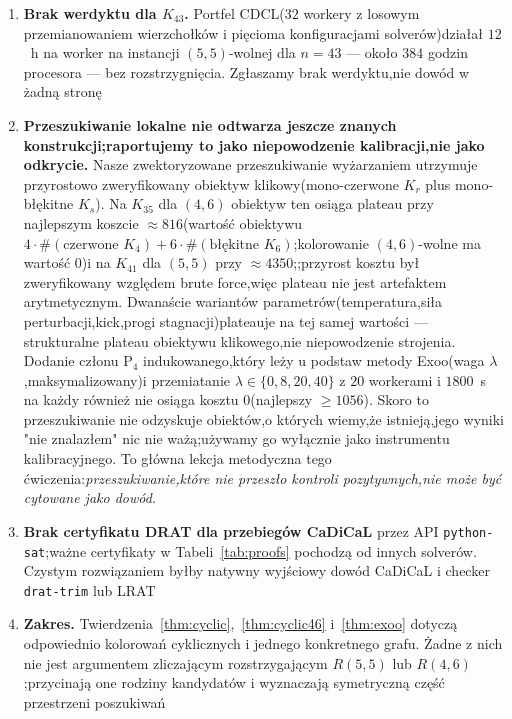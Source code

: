 \documentclass[11pt]{article}
\theoremstyle{definition}
\theoremstyle{plain}
\newcommand{\K}{\ensuremath{K}}
\newcommand{\R}[2]{\ensuremath{R(#1,#2)}}
\begin{document}
\begin{enumerate}
\item \textbf{Brak werdyktu dla $\K_{43}$.} Portfel CDCL($32$ workery z losowym przemianowaniem wierzchołków i pięcioma konfiguracjami solverów)działał $12$~h na worker na instancji $(5,5)$-wolnej dla $n = 43$ --- około $384$ godzin procesora --- bez rozstrzygnięcia. Zgłaszamy brak werdyktu,nie dowód w żadną stronę

\item \textbf{Przeszukiwanie lokalne nie odtwarza jeszcze znanych konstrukcji;raportujemy to jako niepowodzenie kalibracji,nie jako odkrycie.} Nasze zwektoryzowane przeszukiwanie wyżarzaniem utrzymuje przyrostowo zweryfikowany obiektyw klikowy(mono-czerwone $\K_r$ plus mono-błękitne $\K_s$). Na $K_{35}$ dla $(4,6)$ obiektyw ten osiąga plateau przy najlepszym koszcie $\approx 816$(wartość obiektywu $4\cdot\#(\text{czerwone }K_4) + 6\cdot\#(\text{błękitne }K_6)$;kolorowanie $(4,6)$-wolne ma wartość $0$)i na $K_{41}$ dla $(5,5)$ przy $\approx 4350$;;przyrost kosztu był zweryfikowany względem brute force,więc plateau nie jest artefaktem arytmetycznym. Dwanaście wariantów parametrów(temperatura,siła perturbacji,kick,progi stagnacji)plateauje na tej samej wartości --- strukturalne plateau obiektywu klikowego,nie niepowodzenie strojenia. Dodanie członu $\mathrm{P}_4$ indukowanego,który leży u podstaw metody Exoo(waga $\lambda$,maksymalizowany)i przemiatanie $\lambda \in \{0,8,20,40\}$ z $20$ workerami i $1800$~s na każdy również nie osiąga kosztu $0$(najlepszy $\ge 1056$). Skoro to przeszukiwanie nie odzyskuje obiektów,o których wiemy,że istnieją,jego wyniki "nie znalazłem" nic nie ważą;używamy go wyłącznie jako instrumentu kalibracyjnego. To główna lekcja metodyczna tego ćwiczenia:\emph{przeszukiwanie,które nie przeszło kontroli pozytywnych,nie może być cytowane jako dowód}.

\item \textbf{Brak certyfikatu DRAT dla przebiegów CaDiCaL} przez API \texttt{python-sat};ważne certyfikaty w Tabeli~\ref{tab:proofs} pochodzą od innych solverów. Czystym rozwiązaniem byłby natywny wyjściowy dowód CaDiCaL i checker \texttt{drat-trim} lub LRAT

\item \textbf{Zakres.} Twierdzenia~\ref{thm:cyclic},~\ref{thm:cyclic46} i~\ref{thm:exoo} dotyczą odpowiednio kolorowań cyklicznych i jednego konkretnego grafu. Żadne z nich nie jest argumentem zliczającym rozstrzygającym $\R{5}{5}$ lub $\R{4}{6}$;przycinają one rodziny kandydatów i wyznaczają symetryczną część przestrzeni poszukiwań

\end{enumerate}
\end{document}
